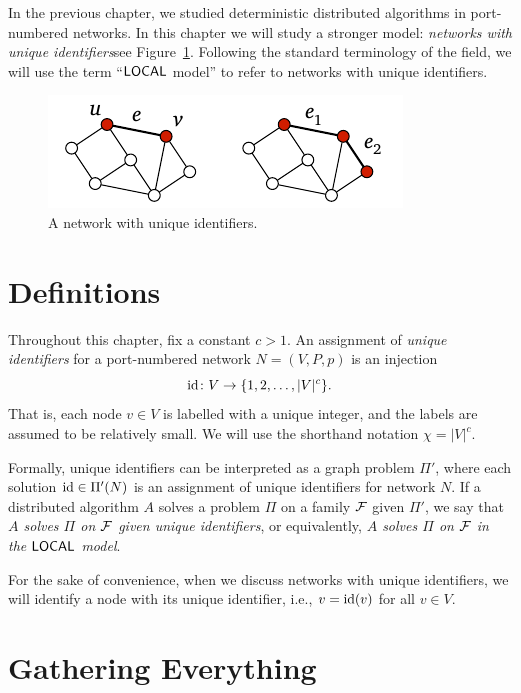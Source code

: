 
In the previous chapter, we studied deterministic distributed algorithms in port-numbered networks. In this chapter we will study a stronger model: \emph{networks with unique identifiers}\mydash see Figure~\ref{fig:unique-ids}. Following the standard terminology of the field, we will use the term ``$\textup{\sffamily LOCAL}$ model'' to refer to networks with unique identifiers.

\begin{figure}
    \centering
    \includegraphics[page=\PUniqueIds]{figs.pdf}
    \caption{A network with unique identifiers.}\label{fig:unique-ids}
\end{figure}


\section{Definitions}\label{sec:unique-id}

Throughout this chapter, fix a constant $c > 1$. An assignment of \emph{unique identifiers} for a port-numbered network $N = (V,P,p)$ is an injection
\[
    \operatorname{id} \colon V \to \{1,2, \dotsc, |V|^c\}.
\]
That is, each node $v \in V$ is labelled with a unique integer, and the labels are assumed to be relatively small. We will use the shorthand notation $\chi = |V|^c$.

Formally, unique identifiers can be interpreted as a graph problem $\Pi'$, where each solution $\operatorname{id} \in \Pi'(N)$ is an assignment of unique identifiers for network $N$. If a distributed algorithm $A$ solves a problem $\Pi$ on a family $\mathcal{F}$ given $\Pi'$, we say that \emph{$A$ solves $\Pi$ on $\mathcal{F}$ given unique identifiers}, or equivalently, \emph{$A$ solves $\Pi$ on $\mathcal{F}$ in the $\textup{\sffamily LOCAL}$ model}.

For the sake of convenience, when we discuss networks with unique identifiers, we will identify a node with its unique identifier, i.e., $v = \operatorname{id}(v)$ for all $v \in V$.


\section{Gathering Everything}\label{sec:gather}

